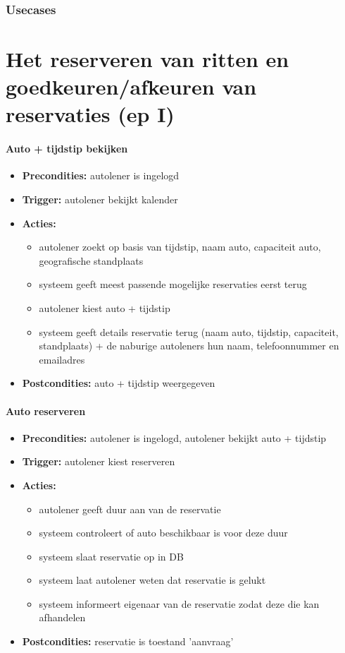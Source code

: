 \documentclass[]{article}
\begin{document}
\tableofcontents

\setcounter{section}{0}
\setcounter{subsection}{0}
\section{Usecases}
\part{Het reserveren van ritten en goedkeuren/afkeuren van reservaties (ep I)}

\subsection{Auto + tijdstip bekijken}
\begin{itemize}
\item \textbf{Precondities:} autolener is ingelogd
\item \textbf{Trigger:} autolener bekijkt kalender
\item \textbf{Acties:} \begin{itemize}
\item	autolener zoekt op basis van tijdstip, naam auto, capaciteit auto, geografische standplaats
\item	systeem geeft meest passende mogelijke reservaties eerst terug
\item	autolener kiest auto + tijdstip 
\item 	systeem geeft details reservatie terug (naam auto, tijdstip, capaciteit, standplaats) + de naburige autoleners hun naam, telefoonnummer en emailadres
\end{itemize}
\item \textbf{Postcondities:} auto + tijdstip weergegeven
\end{itemize}


\subsection{Auto reserveren} \label{reserveren}
\begin{itemize}
\item \textbf{Precondities:} autolener is ingelogd, autolener bekijkt auto + tijdstip
\item \textbf{Trigger:} autolener kiest reserveren
\item \textbf{Acties:} \begin{itemize}
\item 	autolener geeft duur aan van de reservatie
\item systeem controleert of auto beschikbaar is voor deze duur
\item systeem slaat reservatie op in DB
\item      systeem laat autolener weten dat reservatie is gelukt
\item      systeem informeert eigenaar van de reservatie zodat deze die kan afhandelen
\end{itemize}
\item \textbf{Postcondities:} reservatie is toestand 'aanvraag'
\end{itemize}
\end{document}
